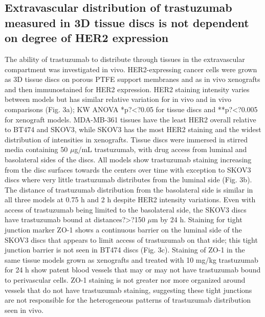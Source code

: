 \subsection{Extravascular distribution of trastuzumab measured in 3D tissue discs is not dependent on degree of HER2 expression}

The ability of trastuzumab to distribute through tissues in the extravascular compartment was investigated in vivo.
HER2-expressing cancer cells were grown as 3D tissue discs on porous PTFE support membranes and as in vivo xenografts and then immunostained for HER2 expression.
HER2 staining intensity varies between models but has similar relative variation for in vivo and in vivo comparisons (Fig.
3a); KW ANOVA *p?<?0.05 for tissue discs and **p?<?0.005 for xenograft models.
MDA-MB-361 tissues have the least HER2 overall relative to BT474 and SKOV3, while SKOV3 has the most HER2 staining and the widest distribution of intensities in xenografts.
Tissue discs were immersed in stirred media containing 50 $\mu$g/mL trastuzumab, with drug access from luminal and basolateral sides of the discs.
All models show trastuzumab staining increasing from the disc surfaces towards the centers over time with exception to SKOV3 discs where very little trastuzumab distributes from the luminal side (Fig.
3b).
The distance of trastuzumab distribution from the basolateral side is similar in all three models at 0.75 h and 2 h despite HER2 intensity variations.
Even with access of trastuzumab being limited to the basolateral side, the SKOV3 discs have trastuzumab bound at distances?>?150 $\mu$m by 24 h.
Staining for tight junction marker ZO-1 shows a continuous barrier on the luminal side of the SKOV3 discs that appears to limit access of trastuzumab on that side; this tight junction barrier is not seen in BT474 discs (Fig.
3c).
Staining of ZO-1 in the same tissue models grown as xenografts and treated with 10 mg/kg trastuzumab for 24 h show patent blood vessels that may or may not have trastuzumab bound to perivascular cells.
ZO-1 staining is not greater nor more organized around vessels that do not have trastuzumab staining, suggesting these tight junctions are not responsible for the heterogeneous patterns of trastuzumab distribution seen in vivo.

